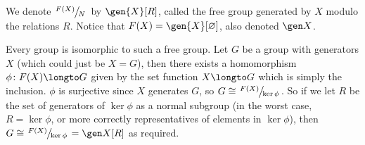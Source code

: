 We denote $\slfrac{F(X)}N$ by $\gen{X}[R]$, called the free group generated by $X$ modulo the relations $R$.
Notice that $F(X)=\gen{X}[\varnothing]$, also denoted $\gen X$.

Every group is isomorphic to such a free group.
Let $G$ be a group with generators $X$ (which could just be $X=G$), then there exists a homomorphism $\phi\colon F(X)\longto G$ given by the set function $X\longto G$ which is simply the inclusion.
$\phi$ is surjective since $X$ generates $G$, so $G\cong\slfrac{F(X)}{\ker\phi}$.
So if we let $R$ be the set of generators of $\ker\phi$ as a normal subgroup (in the worst case, $R=\ker\phi$, or more correctly representatives of elements in $\ker\phi$), then
$G\cong\slfrac{F(X)}{\ker\phi}=\gen X[R]$ as required.

